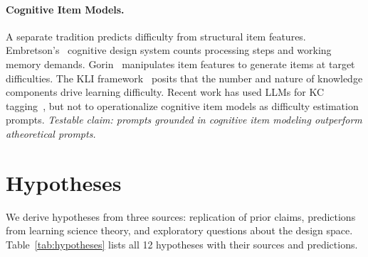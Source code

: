 \documentclass[runningheads]{llncs}
\begin{document}
\paragraph{Cognitive Item Models.}
A separate tradition predicts difficulty from structural item features. Embretson's~\cite{embretson1998} cognitive design system counts processing steps and working memory demands. Gorin~\cite{gorin2005} manipulates item features to generate items at target difficulties. The KLI framework~\cite{koedinger2012} posits that the number and nature of knowledge components drive learning difficulty. Recent work has used LLMs for KC tagging~\cite{moore2024}, but not to operationalize cognitive item models as difficulty estimation prompts. \emph{Testable claim: prompts grounded in cognitive item modeling outperform atheoretical prompts.}

\section{Hypotheses}

We derive hypotheses from three sources: replication of prior claims, predictions from learning science theory, and exploratory questions about the design space. Table~\ref{tab:hypotheses} lists all 12 hypotheses with their sources and predictions.
\end{document}
